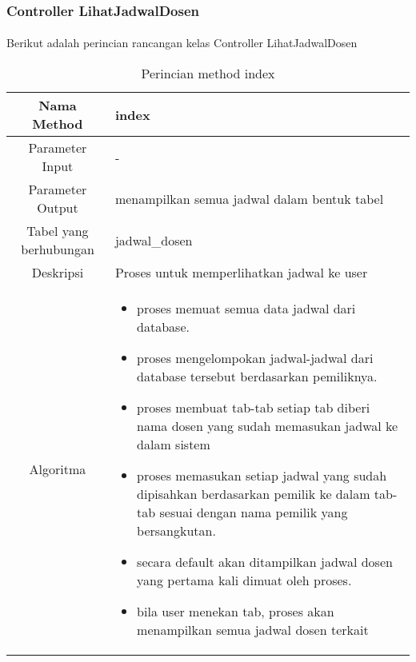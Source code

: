 \subsubsection{Controller LihatJadwalDosen}
\paragraph{} Berikut adalah perincian rancangan kelas Controller LihatJadwalDosen \\
\begin{center}
\begin{table}[H]
\begin{tabular}{|c|p{11cm}|}
\hline
Nama Method 	& 	index 	\\
\hline
Parameter Input & - \\
\hline
Parameter Output & menampilkan semua jadwal dalam bentuk tabel \\
\hline
Tabel yang berhubungan & jadwal\_dosen \\
\hline
Deskripsi	& Proses untuk memperlihatkan jadwal ke user \\
\hline
Algoritma	& \begin{itemize}
				\item proses memuat semua data jadwal dari database.
				\item proses mengelompokan jadwal-jadwal dari database tersebut berdasarkan pemiliknya.
				\item proses membuat tab-tab setiap tab diberi nama dosen yang sudah memasukan jadwal ke dalam sistem
				\item proses memasukan setiap jadwal yang sudah dipisahkan berdasarkan pemilik ke dalam tab-tab sesuai dengan nama pemilik yang bersangkutan.
				\item secara default akan ditampilkan jadwal dosen yang pertama kali dimuat oleh proses.
				\item bila user menekan tab, proses akan menampilkan semua jadwal dosen terkait
				\end{itemize} \\
\hline
\end{tabular}
\caption{Perincian method index}
\end{table}
\end{center}


